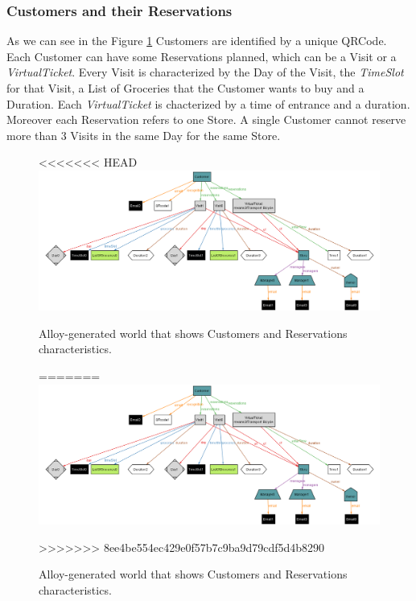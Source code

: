 \documentclass[a4paper, 12pt, oneside]{article}
\begin{document}
\begin{enumerate}[labelindent=20pt, label={UC.\arabic*}, itemindent=1em,leftmargin=!]
\subsubsection{Customers and their Reservations}
As we can see in the Figure \ref{alloy_customer} Customers are identified by a unique QRCode. Each Customer can have some Reservations planned, which can be a Visit or a \textit{VirtualTicket}. Every Visit is characterized by the Day of the Visit, the \textit{TimeSlot} for that Visit, a List of Groceries that the Customer wants to buy and a Duration.  Each \textit{VirtualTicket} is chacterized by a time of entrance and a duration. Moreover each Reservation refers to one Store. A single Customer cannot reserve more than 3 Visits in the same Day for the same Store.
\begin{figure}[h!]
\centering
<<<<<<< HEAD
    \centering
    \includegraphics[height=0.27\textheight, scale=0.3, keepaspectratio]{img/alloy/alloy_customer_reservations.png}
    \caption{Alloy-generated world that shows Customers and Reservations characteristics.}
    \label{alloy_customer}
=======
	\centering
  	\includegraphics[height=0.27\textheight, scale=0.3, keepaspectratio]{img/alloy/alloy_customer_reservations.png}
	\caption{Alloy-generated world that shows Customers and Reservations characteristics.}
 	\label{alloy_customer}
>>>>>>> 8ee4be554ec429e0f57b7c9ba9d79cdf5d4b8290
\end{figure}


\end{enumerate}
\end{document}
